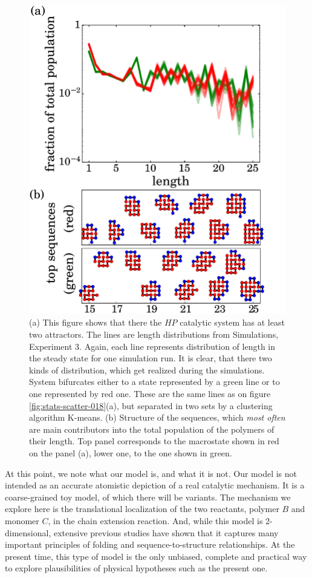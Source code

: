 \documentclass[5p,times]{elsarticle}
\begin{document}
\begin{figure}[h!]
  \centering
  \includegraphics[width=0.9\columnwidth]{pictures/distr-1837-dynamics.pdf}
  \caption{\footnotesize{\textbf{} (a) This figure shows that there the $HP$ catalytic system has 
at least two attractors. The lines are length distributions from Simulations, Experiment 3. Again, 
each line represents distribution of length in the steady state for one simulation run. It is 
clear, that there two kinds of distribution, which get realized during the simulations. System 
bifurcates either to a state represented by a green line or to one represented by red one. These 
are the same lines as on figure \ref{fig:stats-scatter-018}(a), but separated in two sets by a 
clustering algorithm K-means. (b) Structure of the sequences, which \textit{most often} 
are main contributors into the total population of the polymers of their length. Top panel 
corresponds to the macrostate shown in red on the panel (a), lower one, to the one shown in green. 
}}
  \label{fig:distr1837-dyn}
\end{figure}


At this point, we note what our model is, and what it is not.  Our model is not intended as an 
 accurate atomistic depiction of a real catalytic mechanism.  It is a coarse-grained toy model, of 
which there will be variants.  The mechanism we explore here is the translational localization of 
the two reactants, polymer $B$ and monomer $C$, in the chain extension reaction.  And, while this 
model is 2-dimensional, extensive previous studies have shown that it captures many important 
principles of folding and sequence-to-structure relationships.  At the present time, this type of 
model is the only unbiased, complete and practical way to explore plausibilities of physical 
hypotheses such as the present one.
\end{document}
